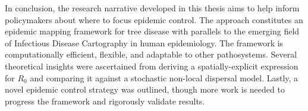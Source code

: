 In conclusion, the research narrative developed in this thesis aims to help inform policymakers about where to focus epidemic control.
The approach constitutes an epidemic mapping framework for tree disease with parallels to the emerging field of Infectious Disease Cartography in human epidemiology. 
The framework is computationally efficient, flexible, and adaptable to other pathosystems.
Several theoretical insights were ascertained from deriving a spatially-explicit expression for $R_0$ and comparing it against a stochastic non-local dispersal model. Lastly, a novel epidemic control strategy was outlined, though more work is needed to progress the framework and rigorously validate results.